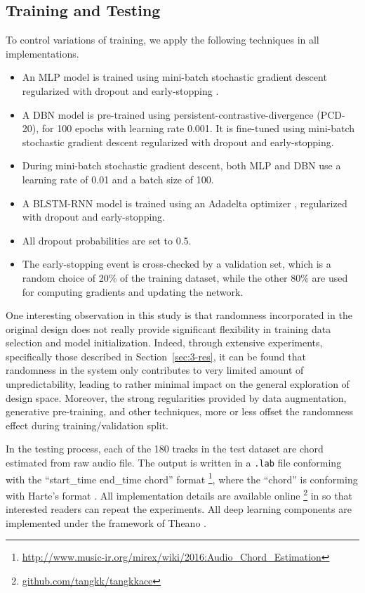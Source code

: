 
\subsection{Training and Testing}

To control variations of training, we apply the following techniques in all implementations. 
\begin{itemize}
\item An MLP model is trained using mini-batch stochastic gradient descent regularized with dropout \cite{srivastava2014dropout} and early-stopping \cite{prechelt1998automatic}. 
\item A DBN model is pre-trained using persistent-contrastive-divergence \cite{tieleman2008training} (PCD-20), for 100 epochs with learning rate 0.001. It is fine-tuned using mini-batch stochastic gradient descent regularized with dropout and early-stopping.
\item During mini-batch stochastic gradient descent, both MLP and DBN use a learning rate of 0.01 and a batch size of 100. 
\item A BLSTM-RNN model is trained using an Adadelta optimizer \cite{zeiler2012adadelta}, regularized with dropout and early-stopping. 
\item All dropout probabilities are set to 0.5. 
\item The early-stopping event is cross-checked by a validation set, which is a random choice of 20\% of the training dataset, while the other 80\% are used for computing gradients and updating the network.
\end{itemize}

One interesting observation in this study is that randomness incorporated in the original design does not really provide significant flexibility in training data selection and model initialization. Indeed, through extensive experiments, specifically those described in Section~\ref{sec:3-res}, it can be found that randomness in the system only contributes to very limited amount of unpredictability, leading to rather minimal impact on the general exploration of design space. Moreover, the strong regularities provided by data augmentation, generative pre-training, and other techniques, more or less offset the randomness effect during training/validation split.

In the testing process, each of the 180 tracks in the test dataset are chord estimated from raw audio file. The output is written in a {\tt .lab} file conforming with the ``start\_time end\_time chord'' format \footnote{\url{http://www.music-ir.org/mirex/wiki/2016:Audio\_Chord\_Estimation}}, where the ``chord'' is conforming with Harte's format \cite{harte2005symbolic}. All implementation details are available online \footnote{\url{github.com/tangkk/tangkkace}} in so that interested readers can repeat the experiments. All deep learning components are implemented under the framework of Theano \cite{bergstra2010theano}.

